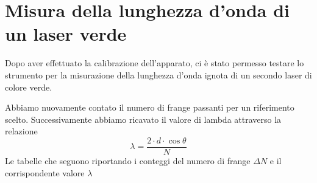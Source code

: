 \section{Misura della lunghezza d'onda di un laser verde}
Dopo aver effettuato la calibrazione dell'apparato, ci è stato permesso testare lo strumento per la misurazione della lunghezza d'onda ignota di un secondo laser di colore verde.

Abbiamo nuovamente contato il numero di frange passanti per un riferimento scelto. Successivamente abbiamo ricavato il valore di lambda attraverso la relazione
\begin{equation}
    \lambda=\dfrac{2\cdot d\cdot \cos\theta}{N}
\end{equation}
\noindent
Le tabelle che seguono riportando i conteggi del numero di frange $\Delta N$ e il corrispondente valore $\lambda$

